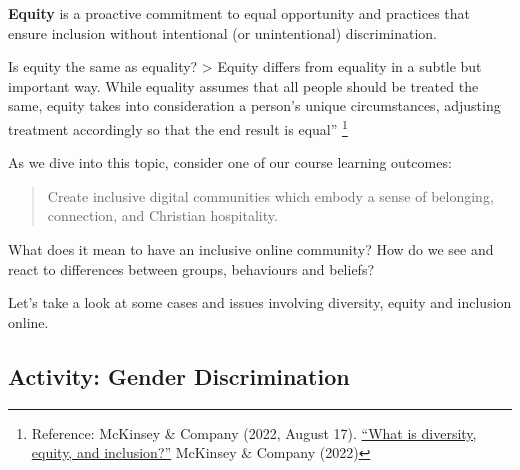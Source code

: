\documentclass[
]{book}
\theoremstyle{definition}
\theoremstyle{definition}
\theoremstyle{definition}
\theoremstyle{definition}
\theoremstyle{remark}
\begin{document}
\textbf{Equity} is a proactive commitment to equal opportunity and practices that ensure inclusion without intentional (or unintentional) discrimination.

Is equity the same as equality?
\textgreater{} Equity differs from equality in a subtle but important way. While equality assumes that all people should be treated the same, equity takes into consideration a person's unique circumstances, adjusting treatment accordingly so that the end result is equal'' \footnote{Reference: McKinsey \& Company (2022, August 17). \href{https://www.mckinsey.com/featured-insights/mckinsey-explainers/what-is-diversity-equity-and-inclusion}{``What is diversity, equity, and inclusion?''} McKinsey \& Company (2022)}

As we dive into this topic, consider one of our course learning outcomes:

\begin{quote}
Create inclusive digital communities which embody a sense of belonging, connection, and Christian hospitality.
\end{quote}

What does it mean to have an inclusive online community? How do we see and react to differences between groups, behaviours and beliefs?

Let's take a look at some cases and issues involving diversity, equity and inclusion online.

\hypertarget{activity-gender-discrimination}{%
\subsection*{Activity: Gender Discrimination}\label{activity-gender-discrimination}}
\end{document}
